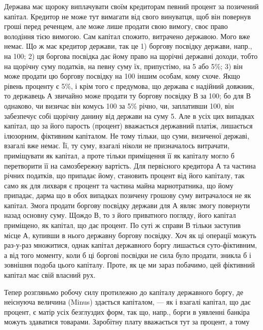 Держава має щороку виплачувати своїм кредиторам певний процент за
позичений капітал. Кредитор не може тут вимагати від свого винуватця, щоб він
повернув гроші перед реченцем, але може лише продати свою вимогу, своє
право володіння тією вимогою. Сам капітал спожито, витрачено державою. Мого
вже немає. Що ж має кредитор держави, так це 1) боргову посвідку держави,
напр., на 100; 2) ця боргова посвідка дає йому право на щорічні
державні доходи, тобто на щорічну суму податків, на певну суму їх, припустімо,
на 5 або 5\%; 3) він може продати цю боргову посвідку на 100
іншим особам, кому схоче. Якщо рівень проценту є 5\%, і крім того є предумова,
що держава є надійний довжник, то державець А звичайно може продати ту боргову
посвідку В за 100; бо для В однаково, чи визичає він комусь 100
за 5\% річно, чи, заплативши 100, він забезпечує собі щорічну данину
від держави на суму 5. Але в усіх цих випадках капітал, що за його
парость (процент) вважається державний платіж, лишається ілюзорним, фіктивним
капіталом. Не тому тільки, що суми, визиченої державі, взагалі вже немає.
Її, ту суму, взагалі ніколи не призначалось витрачати, приміщувати як капітал,
а проте тільки приміщення її як капіталу могло б перетворити її на самозбережну
вартість. Для первісного кредитора А та частина річних податків, що припадає
йому, становить процент від його капіталу, так само як для лихваря є процент
та частина майна марнотратника, що йому припадає, дарма що в обох випадках
позичену грошову суму витрачалося не як капітал. Змога продати боргову
посвідку держави для А являє змогу повернути назад основну суму. Щождо В,
то з його приватного погляду, його капітал приміщено, як капітал, що дає
процент. По суті ж справи В тільки заступив місце А, купивши в нього
державну боргову посвідку. Хоч як ці операції можуть раз-у-раз множитися,
однак капітал державного боргу лишається суто-фіктивним, а від того моменту,
коли б ці боргові посвідки не сила було продати, зникла б і зовнішня подоба
цього капіталу. Проте, як це ми зараз побачимо, цей фіктивний капітал
має свій власний рух.

Тепер розгляньмо робочу силу протилежно до капіталу державного боргу,
де неіснуюча величина (Minus) здається капіталом, — як і взагалі капітал, що дає
процент, є матір усіх безглуздих форм, так що, напр., борги в уявленні банкіра
можуть здаватися товарами. Заробітну плату вважається тут за процент, а тому
\parbreak{}  %
